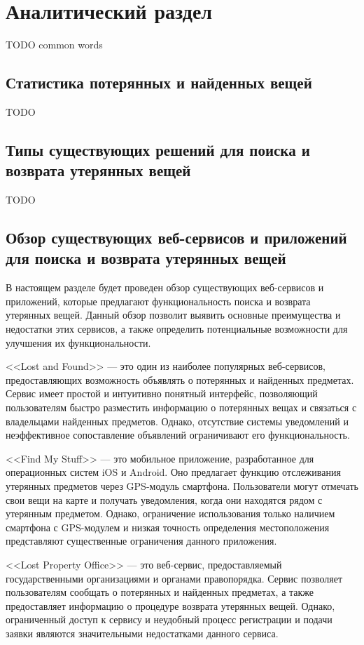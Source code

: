 \documentclass{mirea}
\begin{document}
\section{Аналитический раздел}

TODO common words

\subsection{Статистика потерянных и найденных вещей}

TODO

\subsection{Типы существующих решений для поиска и возврата утерянных вещей}

TODO

\subsection{Обзор существующих веб-сервисов и приложений для поиска и возврата утерянных вещей}

В настоящем разделе будет проведен обзор существующих веб-сервисов 
и приложений, которые предлагают функциональность поиска 
и возврата утерянных вещей. Данный обзор позволит выявить 
основные преимущества и недостатки этих сервисов, 
а также определить потенциальные возможности для улучшения их функциональности.

<<Lost and Found>> --- это один из наиболее популярных веб-сервисов, 
предоставляющих возможность объявлять о потерянных и найденных предметах. 
Сервис имеет простой и интуитивно понятный интерфейс, 
позволяющий пользователям быстро разместить информацию 
о потерянных вещах и связаться с владельцами найденных предметов. 
Однако, отсутствие системы уведомлений и неэффективное сопоставление 
объявлений ограничивают его функциональность.

<<Find My Stuff>> --- это мобильное приложение, разработанное 
для операционных систем iOS и Android. Оно предлагает функцию отслеживания 
утерянных предметов через GPS-модуль смартфона. Пользователи могут отмечать 
свои вещи на карте и получать уведомления, когда они находятся рядом с утерянным предметом. 
Однако, ограничение использования только наличием смартфона с GPS-модулем 
и низкая точность определения местоположения представляют 
существенные ограничения данного приложения.

<<Lost Property Office>> --- это веб-сервис, предоставляемый 
государственными организациями и органами правопорядка. 
Сервис позволяет пользователям сообщать о потерянных 
и найденных предметах, а также предоставляет информацию 
о процедуре возврата утерянных вещей. Однако, 
ограниченный доступ к сервису и неудобный процесс регистрации 
и подачи заявки являются значительными недостатками данного сервиса.
\end{document}
